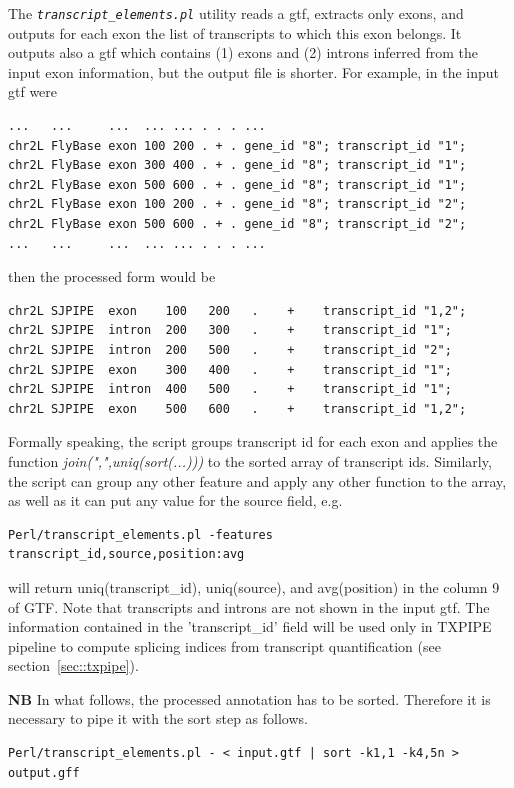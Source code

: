 \documentclass{article}
\newcommand{\prog}[1]{{\tt\em #1}}
\begin{document}
The \prog{transcript\_elements.pl} utility reads a gtf, extracts only exons, and outputs for each exon the list of transcripts to which this exon 
belongs. It outputs also a gtf which contains (1) exons and (2) introns inferred from the input exon information, but the output file is shorter.
For example, in the input gtf were
\begin{verbatim} 
...   ...     ...  ... ... . . . ...      
chr2L FlyBase exon 100 200 . + . gene_id "8"; transcript_id "1";
chr2L FlyBase exon 300 400 . + . gene_id "8"; transcript_id "1"; 
chr2L FlyBase exon 500 600 . + . gene_id "8"; transcript_id "1"; 
chr2L FlyBase exon 100 200 . + . gene_id "8"; transcript_id "2"; 
chr2L FlyBase exon 500 600 . + . gene_id "8"; transcript_id "2"; 
...   ...     ...  ... ... . . . ...
\end{verbatim}
then the processed form would be
\begin{verbatim} 
chr2L SJPIPE  exon    100   200   .    +    transcript_id "1,2";
chr2L SJPIPE  intron  200   300   .    +    transcript_id "1";
chr2L SJPIPE  intron  200   500   .    +    transcript_id "2";
chr2L SJPIPE  exon    300   400   .    +    transcript_id "1";
chr2L SJPIPE  intron  400   500   .    +    transcript_id "1";
chr2L SJPIPE  exon    500   600   .    +    transcript_id "1,2";
\end{verbatim}
Formally speaking, the script groups transcript id for each exon and applies the function {\em join(",",uniq(sort(...)))} to the sorted array of transcript ids. Similarly,
the script can group any other feature and apply any other function to the array, as well as it can put any value for the source field, e.g.
\begin{verbatim}
Perl/transcript_elements.pl -features transcript_id,source,position:avg
\end{verbatim}
will return uniq(transcript\_id), uniq(source), and avg(position) in the column 9 of GTF. Note that transcripts and introns are not shown in the input gtf. 
The information contained in the 'transcript\_id' field will be used only in TXPIPE pipeline to compute splicing indices from transcript quantification (see 
section~\ref{sec::txpipe}).

{\bf NB} In what follows, the processed annotation has to be sorted. Therefore it is necessary to pipe it with the sort step as follows.

\begin{verbatim} 
Perl/transcript_elements.pl - < input.gtf | sort -k1,1 -k4,5n > output.gff
\end{verbatim}
\end{document}
